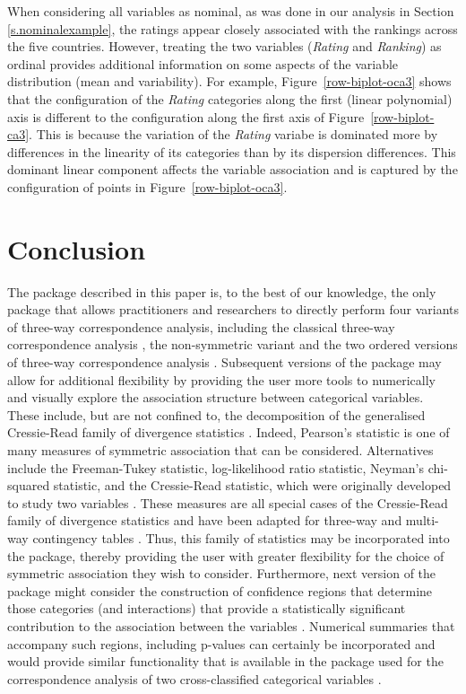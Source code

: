 When considering all variables as nominal, as was done in our analysis in Section \ref{s.nominalexample}, the ratings appear closely associated with the  rankings  across the five countries. However, treating the two variables ({\it Rating} and {\it Ranking}) as ordinal  provides additional information on some aspects of the variable distribution (mean and variability). 
For example, Figure~\ref{row-biplot-oca3}  shows that the configuration of the {\it Rating} categories along the first (linear polynomial) axis is different to the configuration along the first axis of  Figure~\ref{row-biplot-ca3}. This is because the variation of the {\it Rating} variabe is dominated more by differences in the linearity of its categories than by its dispersion differences.  This dominant linear component affects the variable association and is captured by the configuration of points in Figure~\ref{row-biplot-oca3}.

\section{Conclusion}
\label{s.7}
The  package described in this paper is, to the best of our knowledge, the only package that allows practitioners and researchers to directly perform  four variants of three-way correspondence analysis, including the classical three-way correspondence analysis \cite[]{carkro96},  the non-symmetric variant and the two ordered versions of three-way correspondence analysis \cite[]{lombehkro21}. 
Subsequent versions of the package may allow for additional flexibility by providing the user more tools to numerically and visually explore the association structure between categorical variables. These include, but are not confined to, the  decomposition
of the generalised Cressie-Read family of divergence statistics \citep{par96}.
Indeed, Pearson's statistic is one of many measures of symmetric association that can be considered. Alternatives include the Freeman-Tukey statistic, log-likelihood ratio statistic, Neyman's chi-squared statistic, and the Cressie-Read statistic, which were originally developed to study two variables  \citep{cre84,behlom23}. These measures are all special cases of the Cressie-Read family of divergence statistics and have been adapted for three-way and multi-way contingency tables \citep{par96,par03,lombeh22}. 
Thus, this family of statistics may be incorporated into the  package, thereby providing the user with greater flexibility for the choice of symmetric association they wish to consider.
Furthermore, next version of the package might consider  the construction of confidence regions that determine those categories (and interactions) that provide a statistically significant contribution to the association between the variables \citep{beh10, rin96, rin12}. Numerical summaries that accompany such regions, including p-values \citep{behlom15} can certainly be incorporated and would provide similar functionality that is available in the  package used for the correspondence analysis of two cross-classified categorical variables \citep{behlom16}. 

%
%
